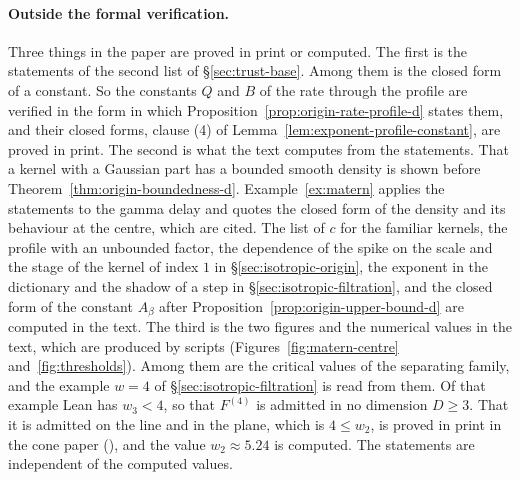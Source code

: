\paragraph{Outside the formal verification.} Three things in the paper are proved in print or
computed. The first is the statements of the second list of \S\ref{sec:trust-base}. Among them
is the closed form of a
constant. So the constants $Q$ and $B$ of the rate through the profile are verified in the form
in which Proposition~\ref{prop:origin-rate-profile-d} states them, and their closed forms,
clause (4) of Lemma~\ref{lem:exponent-profile-constant}, are proved in print. The second is what the text computes from the statements. That a
kernel with a Gaussian part has a bounded smooth density is shown before
Theorem~\ref{thm:origin-boundedness-d}. Example~\ref{ex:matern} applies the statements to the
gamma delay and quotes the closed form of the density and its behaviour at the centre, which
are cited. The list of $c$ for the familiar
kernels, the profile with an unbounded factor, the dependence of the spike on the scale and the
stage of the \Matern{} kernel of index $1$ in
\S\ref{sec:isotropic-origin}, the \Matern{} exponent in the dictionary and the shadow of a step
in \S\ref{sec:isotropic-filtration}, and the closed form of the constant $A_\beta$ after
Proposition~\ref{prop:origin-upper-bound-d} are computed in the text. The third is the two
figures and the numerical values in the text, which are produced by scripts
(Figures~\ref{fig:matern-centre} and~\ref{fig:thresholds}). Among them are the critical values
of the separating family, and the example $w = 4$ of \S\ref{sec:isotropic-filtration} is read
from them. Of that example Lean has $w_3 < 4$, so that $F^{(4)}$ is admitted in no dimension
$D \ge 3$. That it is admitted on the line and in the plane, which is $4 \le w_2$, is proved in
print in the cone paper (), and the value $w_2 \approx 5.24$ is
computed. The statements are independent of the computed values.

